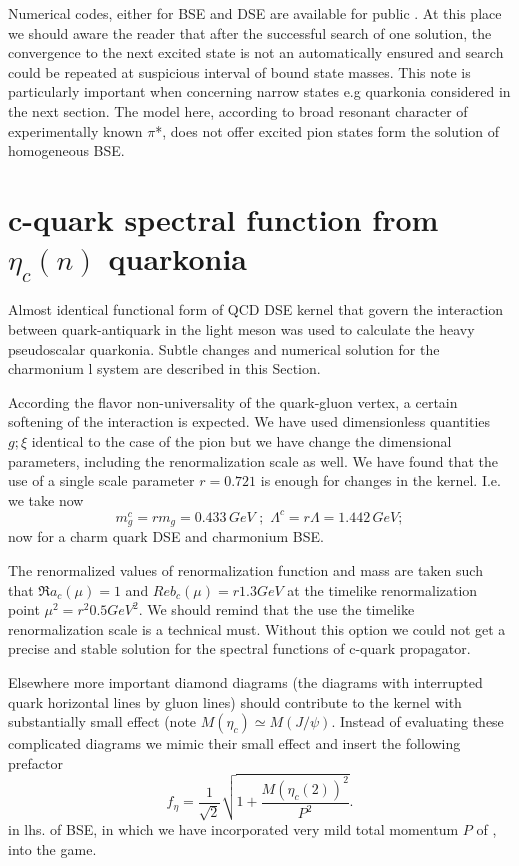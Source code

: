 \documentclass[aps,prd,superscriptaddress,eqsecnum,amsfonts,showpacs,epsfig]{revtex4}
\newcommand{\be}{\begin{equation}}
\newcommand{\ee}{\end{equation}}
\begin{document}
Numerical codes, either for BSE and DSE are available for public \cite{mujweb}. 
At this place we should aware the reader that  
after the successful search of one solution, the convergence to  the next excited state is not an automatically ensured
 and search could be repeated at suspicious interval of bound state masses.
 This note is particularly important when concerning narrow states e.g quarkonia considered in the next section. 
 The model here, according to broad resonant character of experimentally known  $\pi$*, does not offer excited 
 pion states form the solution of homogeneous BSE. 


\section{ c-quark spectral function from $\eta_c(n)$ quarkonia }


Almost identical functional form of  QCD DSE kernel that govern the interaction between quark-antiquark in the 
light meson was used to calculate  the heavy pseudoscalar quarkonia.
Subtle changes and numerical solution for the charmonium l system are described in this Section.

According the flavor non-universality of the quark-gluon vertex,
a certain softening of the interaction  is expected.
We have used    dimensionless quantities  $g; \xi$ identical to  the case of the pion but we 
have change the dimensional parameters, including the renormalization scale as well.
We have found that the  use of a single scale parameter $r=0.721$ is enough for changes in the kernel. I.e. we take now  
 \be
m_g^c=r m_g=0.433\,  GeV \, \, ; \, \, \Lambda^c=r \Lambda =1.442 \,  GeV ;
\ee 
now for a charm quark  DSE and charmonium BSE. 

The renormalized values of  renormalization function and mass are taken  such that $\Re a_c(\mu)=1$  and $Re b_c(\mu)=r 1.3  GeV$
 at the timelike renormalization point  $\mu^2=r^2 0.5 GeV^2$.
 We should remind that the use the timelike renormalization scale is a technical must.
 Without this option we could not get a precise and stable solution for the spectral functions of c-quark propagator. 
 
 


Elsewhere more important diamond diagrams (the diagrams with interrupted quark horizontal  lines by gluon lines) should  contribute to the kernel with substantially small effect (note $M(\eta_c)\simeq M(J/\psi)$. 
Instead of evaluating these  complicated  diagrams 
we mimic their small  effect and  insert the following prefactor
\be \label{pref}
f_{\eta}=\frac{1}{\sqrt{2}}\sqrt{1+\frac{M(\eta_c(2))^2}{P^2}}.
\ee
in lhs. of BSE, in which  we have incorporated  very mild  total  momentum $P$ of ,
into the game.
 
\end{document}
